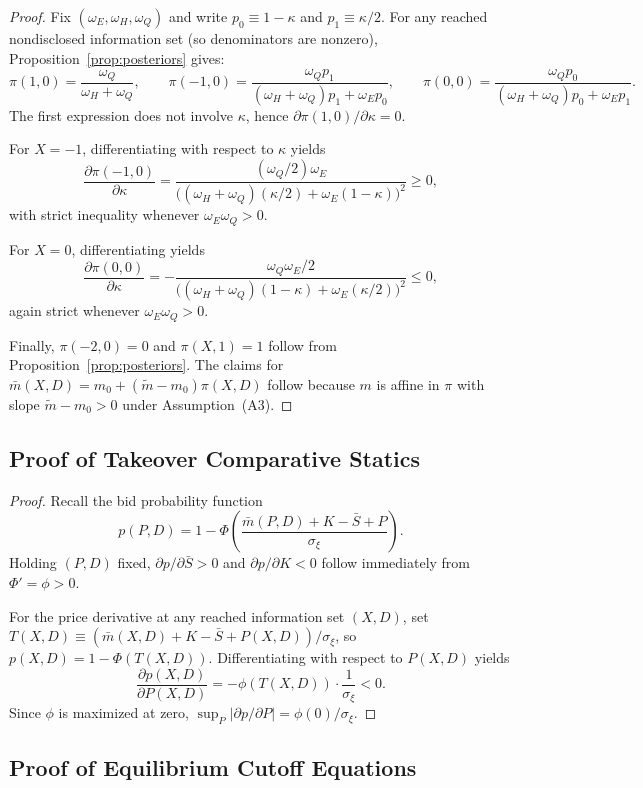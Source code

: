 \documentclass[11pt]{article}
\newcommand{\1}{\mathbf{1}}
\begin{document}
\begin{proof}
Fix $(\omega_E,\omega_H,\omega_Q)$ and write $p_0\equiv 1-\kappa$ and $p_1\equiv \kappa/2$. For any reached nondisclosed information set (so denominators are nonzero), Proposition~\ref{prop:posteriors} gives:
\[
\pi(1,0)=\frac{\omega_Q}{\omega_H+\omega_Q},\qquad
\pi(-1,0)=\frac{\omega_Q p_1}{(\omega_H+\omega_Q)p_1+\omega_E p_0},\qquad
\pi(0,0)=\frac{\omega_Q p_0}{(\omega_H+\omega_Q)p_0+\omega_E p_1}.
\]
The first expression does not involve $\kappa$, hence $\partial \pi(1,0)/\partial\kappa=0$.

For $X=-1$, differentiating with respect to $\kappa$ yields
\[
\frac{\partial \pi(-1,0)}{\partial \kappa}
=\frac{(\omega_Q/2)\omega_E}{\big((\omega_H+\omega_Q)(\kappa/2)+\omega_E(1-\kappa)\big)^2}\ge 0,
\]
with strict inequality whenever $\omega_E\omega_Q>0$.

For $X=0$, differentiating yields
\[
\frac{\partial \pi(0,0)}{\partial \kappa}
=-\frac{\omega_Q\omega_E/2}{\big((\omega_H+\omega_Q)(1-\kappa)+\omega_E(\kappa/2)\big)^2}\le 0,
\]
again strict whenever $\omega_E\omega_Q>0$.

Finally, $\pi(-2,0)=0$ and $\pi(X,1)=1$ follow from Proposition~\ref{prop:posteriors}. The claims for $\bar{m}(X,D)=m_0+(\tilde m-m_0)\pi(X,D)$ follow because $m$ is affine in $\pi$ with slope $\tilde m-m_0>0$ under Assumption~\textup{(A3)}.
\end{proof}

\subsection{Proof of Takeover Comparative Statics}
\label{app:proof-cs-takeover}

\begin{proof}
Recall the bid probability function
\[
p(P,D)=1-\Phi\!\left(\frac{\bar{m}(P,D)+K-\bar S + P}{\sigma_\xi}\right).
\]
Holding $(P,D)$ fixed, $\partial p/\partial \bar S>0$ and $\partial p/\partial K<0$ follow immediately from $\Phi'=\phi>0$.

For the price derivative at any reached information set $(X,D)$, set $T(X,D)\equiv (\bar{m}(X,D)+K-\bar S + P(X,D))/\sigma_\xi$, so $p(X,D)=1-\Phi(T(X,D))$. Differentiating with respect to $P(X,D)$ yields
\[
\frac{\partial p(X,D)}{\partial P(X,D)}=-\phi(T(X,D))\cdot\frac{1}{\sigma_\xi}<0.
\]
Since $\phi$ is maximized at zero, $\sup_{P}|\partial p/\partial P|=\phi(0)/\sigma_\xi$.
\end{proof}

\subsection{Proof of Equilibrium Cutoff Equations}
\label{app:proof-cutoff-eqns}
\end{document}
